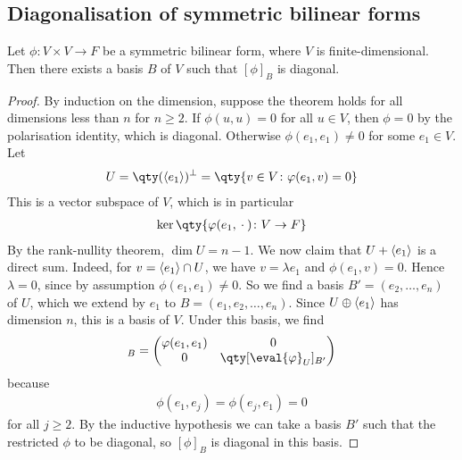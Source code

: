 \subsection{Diagonalisation of symmetric bilinear forms}
\begin{theorem}
	Let $\phi \colon V \times V \to F$ be a symmetric bilinear form, where $V$ is finite-dimensional.
	Then there exists a basis $B$ of $V$ such that $[\phi]_B$ is diagonal.
\end{theorem}
\begin{proof}
	By induction on the dimension, suppose the theorem holds for all dimensions less than $n$ for $n \geq 2$.
	If $\phi(u,u) = 0$ for all $u \in V$, then $\phi = 0$ by the polarisation identity, which is diagonal.
	Otherwise $\phi(e_1, e_1) \neq 0$ for some $e_1 \in V$.
	Let
	\begin{align*}
		U = \qty(\genset{e_1})^\perp = \qty{v \in V \colon \phi(e_1, v) = 0}
	\end{align*}
	This is a vector subspace of $V$, which is in particular
	\begin{align*}
		\ker \qty{ \phi(e_1, {}\cdot{}) \colon V \to F }
	\end{align*}
	By the rank-nullity theorem, $\dim U = n - 1$.
	We now claim that $U + \langle{} e_1 \rangle$ is a direct sum.
	Indeed, for $v = \langle{} e_1 \rangle \cap U$, we have $v = \lambda e_1$ and $\phi(e_1, v) = 0$.
	Hence $\lambda = 0$, since by assumption $\phi(e_1, e_1) \neq 0$.
	So we find a basis $B' = (e_2, \dots, e_n)$ of $U$, which we extend by $e_1$ to $B = (e_1, e_2, \dots, e_n)$.
	Since $U \oplus \langle{} e_1 \rangle$ has dimension $n$, this is a basis of $V$.
	Under this basis, we find
	\begin{align*}
		[\phi]_B = \begin{pmatrix}
			\phi(e_1, e_1) & 0                          \\
			0              & \qty[\eval{\phi}_{U}]_{B'}
		\end{pmatrix}
	\end{align*}
	because
	\begin{align*}
		\phi(e_1, e_j) = \phi(e_j, e_1) = 0
	\end{align*}
	for all $j \geq 2$.
	By the inductive hypothesis we can take a basis $B'$ such that the restricted $\phi$ to be diagonal, so $[\phi]_B$ is diagonal in this basis.
\end{proof}
